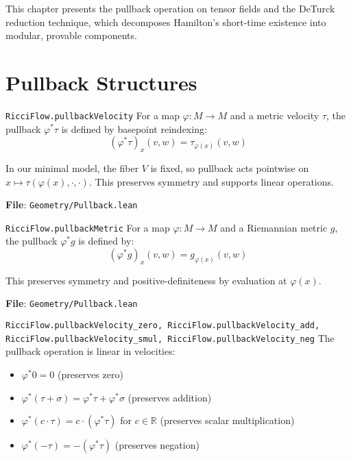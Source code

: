 \providecommand{\lean}[1]{\texttt{#1}}

This chapter presents the pullback operation on tensor fields and the DeTurck reduction technique, which decomposes Hamilton's short-time existence into modular, provable components.

\section{Pullback Structures}

\begin{definition}
\label{def:pullback_velocity}
\lean{RicciFlow.pullbackVelocity}
\leanok
{}
For a map $\varphi : M \to M$ and a metric velocity $\tau$, the pullback $\varphi^*\tau$ is defined by basepoint reindexing:
\[ (\varphi^*\tau)_x(v,w) = \tau_{\varphi(x)}(v,w) \]

In our minimal model, the fiber $V$ is fixed, so pullback acts pointwise on $x \mapsto \tau(\varphi(x), \cdot, \cdot)$. This preserves symmetry and supports linear operations.

\textbf{File}: \texttt{Geometry/Pullback.lean}
\end{definition}

\begin{definition}
\label{def:pullback_metric}
\lean{RicciFlow.pullbackMetric}
\leanok
{}
For a map $\varphi : M \to M$ and a Riemannian metric $g$, the pullback $\varphi^*g$ is defined by:
\[ (\varphi^*g)_x(v,w) = g_{\varphi(x)}(v,w) \]

This preserves symmetry and positive-definiteness by evaluation at $\varphi(x)$.

\textbf{File}: \texttt{Geometry/Pullback.lean}
\end{definition}

\begin{lemma}
\label{lem:pullback_linearity}
\lean{RicciFlow.pullbackVelocity_zero, RicciFlow.pullbackVelocity_add, RicciFlow.pullbackVelocity_smul, RicciFlow.pullbackVelocity_neg}
\leanok
{}
The pullback operation is linear in velocities:
\begin{itemize}
\item $\varphi^*0 = 0$ (preserves zero)
\item $\varphi^*(\tau + \sigma) = \varphi^*\tau + \varphi^*\sigma$ (preserves addition)
\item $\varphi^*(c \cdot \tau) = c \cdot (\varphi^*\tau)$ for $c \in \mathbb{R}$ (preserves scalar multiplication)
\item $\varphi^*(-\tau) = -(\varphi^*\tau)$ (preserves negation)
\end{itemize}
\end{lemma}

